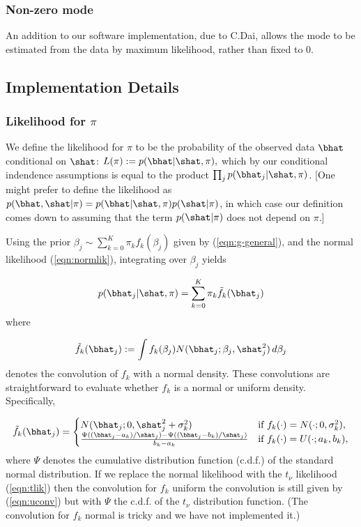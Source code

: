 \subsubsection*{Non-zero mode}

An addition to our software implementation, due to C.Dai, allows the mode to be estimated from the data by maximum likelihood, rather than fixed to 0.

\subsection*{Implementation Details}

\subsubsection*{Likelihood for $\pi$}

We define the likelihood for $\pi$ to be the probability of the observed data $\bhat$ conditional on $\shat$: $L(\pi) := p(\bhat | \shat,\pi),$ which
by our conditional indendence assumptions is equal to the product $\prod_j p(\bhat_j | \shat, \pi)$. [One might prefer to define the likelihood as $p(\bhat, \shat | \pi) = p(\bhat | \shat, \pi) p(\shat | \pi)$, in which case our definition comes down to assuming that the term $p(\shat | \pi)$ does not depend on $\pi$.]

Using the prior $\beta_j \sim \sum_{k=0}^K \pi_k f_k(\beta_j)$ given by (\ref{eqn:g-general}), and the normal likelihood (\ref{eqn:normlik}), integrating over $\beta_j$ yields

\begin{equation}
p(\bhat_j | \shat,\pi)  = \sum_{k=0}^K \pi_k \tilde{f}_k(\bhat_j)
\end{equation}
where

\begin{equation}
\tilde{f}_k(\bhat_j) := \int f_k(\beta_j) N(\bhat_j; \beta_j,\shat^2_j) \, d\beta_j
\end{equation}
denotes the convolution of $f_k$ with a normal density.
These convolutions are straightforward to evaluate whether $f_k$ is a normal or uniform density.
Specifically,

\begin{equation}
\label{eqn:uconv}
\tilde{f}_k(\bhat_j)  = 
\begin{cases}
N(\bhat_j;0, \shat_j^2 +  \sigma_k^2) & \text{if $f_k(\cdot) = N(\cdot; 0, \sigma_k^2)$}, \\
\frac{\Psi((\bhat_j-a_k)/\shat_j) - \Psi((\bhat_j-b_k)/\shat_j)}{b_k-a_k} & \text{if $f_k(\cdot) = U(\cdot; a_k,b_k)$},
\end{cases}
\end{equation}
where $\Psi$ denotes the cumulative distribution function (c.d.f.) of the standard normal distribution.
If we replace the normal likelihood with the $t_\nu$ likelihood (\ref{eqn:tlik}) then the convolution 
for $f_k$ uniform the convolution is still given by (\ref{eqn:uconv}) but with $\Psi$ the c.d.f. 
of the $t_\nu$ distribution function. (The convolution for $f_k$ normal is tricky and we have not implemented it.)

